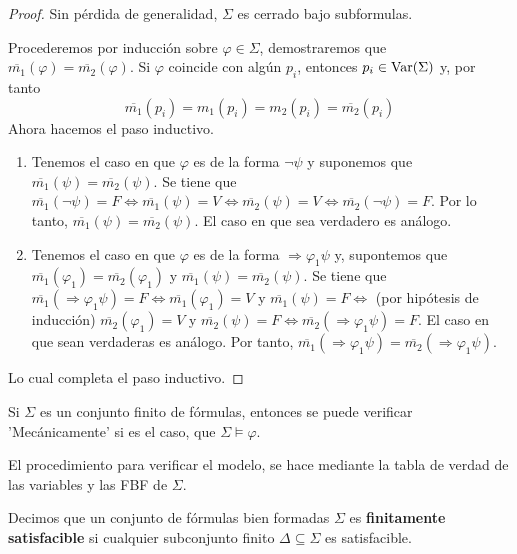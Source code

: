 \documentclass[12pt]{report}
\theoremstyle{largebreak}
\begin{document}
    \begin{proof}
        Sin pérdida de generalidad, $\Sigma$ es cerrado bajo subformulas.
        
        Procederemos por inducción sobre $\varphi\in\Sigma$, demostraremos que $\overline{m_1}(\varphi)=\overline{m_2}(\varphi)$.
        Si $\varphi$ coincide con algún $p_i$, entonces $p_i\in\textup{Var}(\Sigma)$ y, por tanto
        \begin{equation*}
            \overline{m_1}(p_i)=m_1(p_i)=m_2(p_i)=\overline{m_2}(p_i)
        \end{equation*}
        Ahora hacemos el paso inductivo. 
        \begin{enumerate}
            \item Tenemos el caso en que $\varphi$ es de la forma $\neg\psi$ y suponemos que $\overline{m_1}(\psi)=\overline{m_2}(\psi)$. Se tiene que $\overline{m_1}(\neg \psi)=F\iff \overline{m_1}(\psi) = V \iff\overline{m_2}(\psi)=V\iff\overline{m_2}(\neg \psi)=F$. Por lo tanto, $\overline{m_1}(\psi)=\overline{m_2}(\psi)$. El caso en que sea verdadero es análogo.
            
            \item Tenemos el caso en que $\varphi$ es de la forma $\Rightarrow\varphi_1\psi$ y, supontemos que $\overline{m_1}(\varphi_1)=\overline{m_2}(\varphi_1)$ y $\overline{m_1}(\psi)=\overline{m_2}(\psi)$. Se tiene que $\overline{m_1}(\Rightarrow\varphi_1\psi)=F\iff\overline{m_1}(\varphi_1)=V$ y $\overline{m_1}(\psi)=F\iff$ (por hipótesis de inducción) $\overline{m_2}(\varphi_1)=V$ y $\overline{m_2}(\psi)=F\iff\overline{m_2}(\Rightarrow\varphi_1\psi)=F$. El caso en que sean verdaderas es análogo. Por tanto, $\overline{m_1}(\Rightarrow\varphi_1\psi)=\overline{m_2}(\Rightarrow\varphi_1\psi)$.
        \end{enumerate}
        Lo cual completa el paso inductivo.
    \end{proof}

    \begin{cor}
        Si $\Sigma$ es un conjunto finito de fórmulas, entonces se puede verificar 'Mecánicamente' si es el caso, que $\Sigma\vDash\varphi$.
    \end{cor}

    El procedimiento para verificar el modelo, se hace mediante la tabla de verdad de las variables y las FBF de $\Sigma$.

    \begin{mydef}
        Decimos que un conjunto de fórmulas bien formadas $\Sigma$ es \textbf{finitamente satisfacible} si cualquier subconjunto finito $\Delta\subseteq\Sigma$ es satisfacible.
    \end{mydef}
\end{document}
